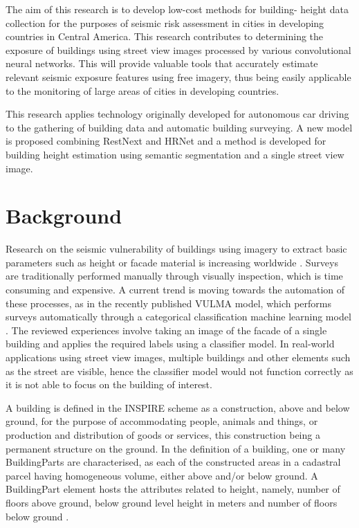 \documentclass[journal,article,submit,pdftex,moreauthors]{Definitions/mdpi}
\begin{document}
The aim of this research is to develop low-cost methods for building- height data collection for the purposes of seismic risk assessment in cities in developing countries in Central America. This research contributes to determining the exposure of buildings using street view images processed by various convolutional neural networks. This will provide valuable tools that accurately estimate relevant seismic exposure features using free imagery, thus being easily applicable to the monitoring of large areas of cities in developing countries.

This research applies technology originally developed for autonomous car driving to the gathering of building data and automatic building surveying. A new model is proposed combining RestNext and HRNet and a method is developed for building height estimation using semantic segmentation and a single street view image. 

\section{Background}

Research on the seismic vulnerability of buildings using imagery to extract basic parameters such as height or facade material is increasing worldwide \cite{Esquivel-Salas2022RemoteRica}. Surveys are traditionally performed manually through visually inspection, which is time consuming and expensive. A current trend is moving towards the automation of these processes, as in the recently published  VULMA model, which performs surveys automatically through a categorical classification machine learning model \cite{Cardellicchio2023AProject}. 
The reviewed experiences involve taking an image of the facade of a single building and applies the required labels using a classifier model. In real-world applications using street view images, multiple buildings and other elements such as the street are visible, hence the classifier model would not function correctly as it is not able to focus on the building of interest.

A building is defined in the INSPIRE scheme \cite{2013INSPIREGuidelines} as a construction, above and below ground, for the purpose of accommodating people, animals and things, or production and distribution of goods or services, this construction being a permanent structure on the ground. In the definition of a building, one or many BuildingParts are characterised, as each of the constructed areas in a cadastral parcel having homogeneous volume, either above and/or below ground. A BuildingPart element hosts the attributes related to height, namely, number of floors above ground, below ground level height in meters and number of floors below ground \cite{2013INSPIREGuidelines}.
\end{document}
